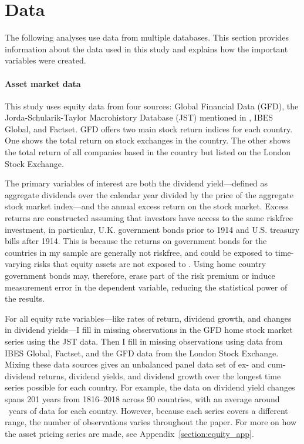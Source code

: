 
\section{Data}\label{section:data}

The following analyses use data from multiple databases. This section provides information about the data used in this study and explains how the important variables were created.

\paragraph{Asset market data}

This study uses equity data from four sources: Global Financial Data (GFD), the Jorda-Schularik-Taylor Macrohistory Database (JST) mentioned in \citet*{Jorda2020}, IBES Global, and Factset. GFD offers two main stock return indices for each country. One shows the total return on stock exchanges in the country. The other shows the total return of all companies based in the country but listed on the London Stock Exchange.  

The primary variables of interest are both the dividend yield---defined as aggregate dividends over the calendar year divided by the price of the aggregate stock market index---and the annual excess return on the stock market. Excess returns are constructed assuming that investors have access to the same riskfree investment, in particular,  U.K. government bonds prior to 1914 and U.S. treasury bills after 1914.  This is because the returns on government bonds for the countries in my sample are generally not riskfree, and could be exposed to time-varying risks that equity assets are not exposed to \citep*{Miller2020}. Using home country government bonds may, therefore, erase part of the risk premium or induce measurement error in the dependent variable, reducing the statistical power of the results.

For all equity rate variables---like rates of return, dividend growth, and changes in dividend yields---I fill in missing observations in the GFD home stock market series using the JST data. Then I fill in missing observations using data from IBES Global, Factset, and the GFD data from the London Stock Exchange. Mixing these data sources gives an unbalanced panel data set of ex- and cum-dividend returns, dividend yields, and dividend growth over the longest time series possible for each country. For example, the data on dividend yield changes spans 201 years from 1816--2018 across 90 countries, with an average around \avgDivYldYears\ years of data for each country. However, because each series covers a different range, the number of observations varies throughout the paper. For more on how the asset pricing series are made, see Appendix~\ref{section:equity_app}.

